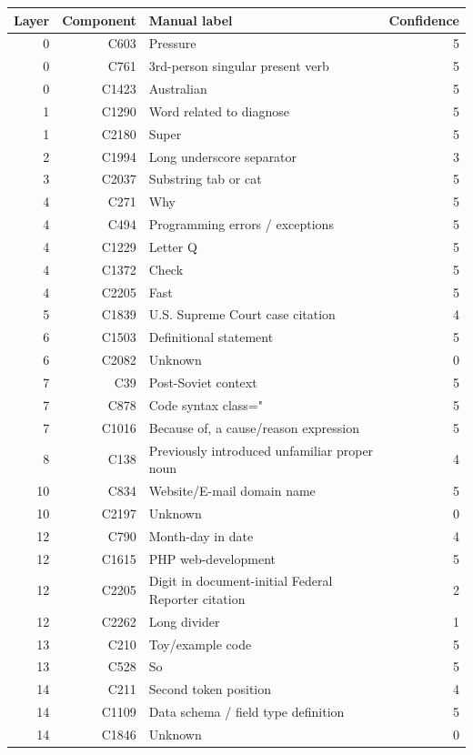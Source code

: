 \begin{tabular}{@{}rrp{}r@{}}
  \toprule
  Layer & Component & Manual label & Confidence \\
  \midrule
  0 & C603 & Pressure & 5 \\
  0 & C761 & 3rd-person singular present verb & 5 \\
  0 & C1423 & Australian & 5 \\
  1 & C1290 & Word related to diagnose & 5 \\
  1 & C2180 & Super & 5 \\
  2 & C1994 & Long underscore separator & 3 \\
  3 & C2037 & Substring tab or cat & 5 \\
  4 & C271 & Why & 5 \\
  4 & C494 & Programming errors / exceptions & 5 \\
  4 & C1229 & Letter Q & 5 \\
  4 & C1372 & Check & 5 \\
  4 & C2205 & Fast & 5 \\
  5 & C1839 & U.S. Supreme Court case citation & 4 \\
  6 & C1503 & Definitional statement & 5 \\
  6 & C2082 & Unknown & 0 \\
  7 & C39 & Post-Soviet context & 5 \\
  7 & C878 & Code syntax class=" & 5 \\
  7 & C1016 & Because of, a cause/reason expression & 5 \\
  8 & C138 & Previously introduced unfamiliar proper noun & 4 \\
  10 & C834 & Website/E-mail domain name & 5 \\
  10 & C2197 & Unknown & 0 \\
  12 & C790 & Month-day in date & 4 \\
  12 & C1615 & PHP web-development & 5 \\
  12 & C2205 & Digit in document-initial Federal Reporter citation & 2 \\
  12 & C2262 & Long divider & 1 \\
  13 & C210 & Toy/example code & 5 \\
  13 & C528 & So & 5 \\
  14 & C211 & Second token position & 4 \\
  14 & C1109 & Data schema / field type definition & 5 \\
  14 & C1846 & Unknown & 0 \\

\end{tabular}
